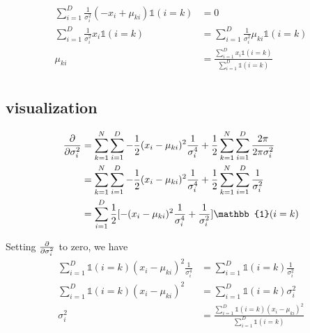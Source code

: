 \documentclass[letterpaper, 12]{article}
\begin{document}
\begin{equation*}
\begin{split}
\sum_{i = 1}^{D} \frac{1}{\sigma_{i} ^2}
		(- x_{i} + \mu_{ki})  \mathbb{1} ( i = k) &= 0 \\
\sum_{i = 1}^{D} \frac{1}{\sigma_{i} ^2}  x_{i}  \mathbb{1} ( i = k) &= 	\sum_{i = 1}^{D} \frac{1}{\sigma_{i} ^2} \mu_{ki}  \mathbb{1} ( i = k) \\
\mu_{ki} &= \frac{\sum_{i = 1}^{D} x_{i}{\mathbb{1} ( i = k)}}{\sum_{i = 1}^{D} {\mathbb{1} ( i = k)}}\\
\end{split}
\end{equation*}

 
\subsection{visualization}
\begin{equation*}
\begin{split}
\pdv{}{\sigma_{i} ^2} &= \sum_{k = 1}^{N} \sum_{i = 1}^{D} - \frac{1}{2}(x_{i} - \mu_{ki})^2 \frac{1}{\sigma_{i} ^4} + \frac{1}{2}\sum_{k = 1}^{N} \sum_{i = 1}^{D} \frac{2 \pi}{2\pi \sigma_{i} ^2}\\
&=  \sum_{k = 1}^{N} \sum_{i = 1}^{D} - \frac{1}{2}(x_{i} - \mu_{ki})^2 \frac{1}{\sigma_{i} ^4} + \frac{1}{2}\sum_{k = 1}^{N} \sum_{i = 1}^{D} \frac{1}{ \sigma_{i} ^2}\\
&=  \sum_{i = 1}^{D} \frac{1}{2} [ -(x_{i} - \mu_{ki})^2 \frac{1}{\sigma_{i} ^4} + \frac{1}{\sigma_{i} ^2}]{\mathbb{1} ( i = k)}\\
\end{split}
\end{equation*}
 
Setting $\pdv{}{\sigma_{i} ^2}$ to zero, we have\\

\begin{equation*}
\begin{split}
\sum_{i = 1}^{D} {\mathbb{1} ( i = k)} (x_{i} - \mu_{ki})^2 \frac{1}{\sigma_{i} ^4}
&= \sum_{i=1}^{D} {\mathbb{1} ( i = k)} \frac{1}{\sigma_{i} ^2}\\
\sum_{i = 1}^{D} {\mathbb{1} ( i = k)} (x_{i} - \mu_{ki})^2 
&= \sum_{i=1}^{D} {\mathbb{1} ( i = k)} \sigma_{i} ^2\\
\sigma_{i} ^2 &= \frac{\sum_{i = 1}^{D} {\mathbb{1} ( i = k)} (x_{i} - \mu_{ki})^2}{\sum_{i=1}^{D} {\mathbb{1} ( i = k)}}
\end{split}
\end{equation*}
\end{document}
